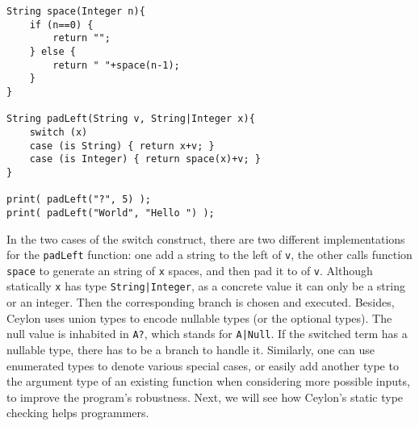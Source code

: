 
\begin{lstlisting}
String space(Integer n){
	if (n==0) {
		return "";
	} else {
		return " "+space(n-1);
	}
}

String padLeft(String v, String|Integer x){
	switch (x)
	case (is String) { return x+v; }
	case (is Integer) { return space(x)+v; }
}

print( padLeft("?", 5) );
print( padLeft("World", "Hello ") );
\end{lstlisting}
%
In the two cases of the switch construct, there are two different implementations
for the \lstinline{padLeft} function: one add a string to the left of \lstinline{v},
the other calls function \lstinline{space} to generate an string of \lstinline{x} spaces,
and then pad it to of \lstinline{v}.
Although statically \lstinline{x} has type \lstinline{String|Integer}, as a concrete value 
it can only be a string or an integer.
Then the corresponding branch is chosen and executed.
%
Besides, Ceylon uses union types to encode nullable types (or the optional types).
The null value is inhabited in \lstinline{A?}, which stands for \lstinline{A|Null}.
If the switched term has a nullable type, there has to be a branch to handle it.
Similarly, one can use enumerated types to denote various special cases, or easily
add another type to the argument type of an existing function when considering
more possible inputs, to improve the program's robustness.
Next, we will see how Ceylon's static type checking helps programmers.

